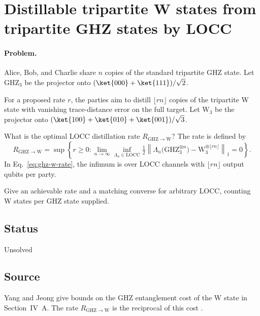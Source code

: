 \section{Distillable tripartite W states from tripartite GHZ states by LOCC}
\label{sec:op_fcdb7b87c7c5a06d}

\paragraph{Problem.}
Alice, Bob, and Charlie share $n$ copies of the standard tripartite GHZ state. Let $\mathrm{GHZ}_3$ be the projector onto $(\ket{000}+\ket{111})/\sqrt{2}$.

For a proposed rate $r$, the parties aim to distill $\lfloor rn\rfloor$ copies of the tripartite W state with vanishing trace-distance error on the full target. Let $\mathrm{W}_3$ be the projector onto $(\ket{100}+\ket{010}+\ket{001})/\sqrt{3}$.

What is the optimal LOCC distillation rate $R_{\mathrm{GHZ}\to\mathrm{W}}$? The rate is defined by
\begin{equation}
  R_{\mathrm{GHZ}\to\mathrm{W}}=\sup\left\{r\geq 0:\lim_{n\to\infty}\inf_{\Lambda_n\in\mathrm{LOCC}}
  \tfrac12\left\lVert\Lambda_n\bigl(\mathrm{GHZ}_3^{\otimes n}\bigr)
  -\mathrm{W}_3^{\otimes\lfloor rn\rfloor}\right\rVert_1=0\right\}.
  \label{eq:ghz-w-rate}
\end{equation}
In Eq.~\eqref{eq:ghz-w-rate}, the infimum is over LOCC channels with $\lfloor rn\rfloor$ output qubits per party.

Give an achievable rate and a matching converse for arbitrary LOCC, counting W states per GHZ state supplied.

\subsection*{Status}

Unsolved

\subsection*{Source}

Yang and Jeong give bounds on the GHZ entanglement cost of the W state in Section~IV~A. The rate $R_{\mathrm{GHZ}\to\mathrm{W}}$ is the reciprocal of this cost .

